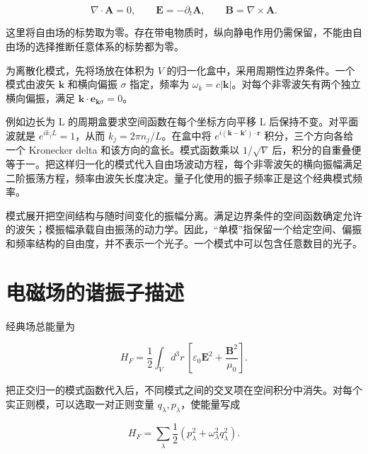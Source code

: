 \documentclass[UTF8,a4paper,zihao=-4,openany,fontset=fandol]{ctexbook}
\begin{document}
\begin{equation*}
\nabla\cdot\mathbf A=0,\qquad
\mathbf E=-\partial_t\mathbf A,\qquad
\mathbf B=\nabla\times\mathbf A.
\tag{1.1}\label{eq:1.1}
\end{equation*}


这里将自由场的标势取为零。存在带电物质时，纵向静电作用仍需保留，不能由自由场的选择推断任意体系的标势都为零。



为离散化模式，先将场放在体积为 $V$ 的归一化盒中，采用周期性边界条件。一个模式由波矢 $\mathbf k$ 和横向偏振 $\sigma$ 指定，频率为 $\omega_k=c|\mathbf k|$。对每个非零波矢有两个独立横向偏振，满足 $\mathbf k\cdot\mathbf e_{\mathbf k\sigma}=0$。



例如边长为 L 的周期盒要求空间函数在每个坐标方向平移 L 后保持不变。对平面波就是 $e^{ik_j L}=1$，从而 $k_j=2\pi n_j/L$。在盒中将 $e^{i(\mathbf k-\mathbf k')\cdot\mathbf r}$ 积分，三个方向各给一个 Kronecker delta 和该方向的盒长。模式函数乘以 $1/\sqrt V$ 后，积分的自重叠便等于一。把这样归一化的模式代入自由场波动方程，每个非零波矢的横向振幅满足二阶振荡方程，频率由波矢长度决定。量子化使用的振子频率正是这个经典模式频率。



模式展开把空间结构与随时间变化的振幅分离。满足边界条件的空间函数确定允许的波矢；模振幅承载自由振荡的动力学。因此，“单模”指保留一个给定空间、偏振和频率结构的自由度，并不表示一个光子。一个模式中可以包含任意数目的光子。



\section{电磁场的谐振子描述}\label{sec:01:2}


经典场总能量为



\begin{equation*}
H_F=\frac12\int_Vd^3r\,
\left[\varepsilon_0\mathbf E^2+
\frac{\mathbf B^2}{\mu_0}\right].
\tag{1.2}\label{eq:1.2}
\end{equation*}


把正交归一的模式函数代入后，不同模式之间的交叉项在空间积分中消失。对每个实正则模，可以选取一对正则变量 $q_\lambda,p_\lambda$，使能量写成



\begin{equation*}
H_F=\sum_\lambda\frac12
\left(p_\lambda^2+\omega_\lambda^2q_\lambda^2\right).
\tag{1.3}\label{eq:1.3}
\end{equation*}
\end{document}
